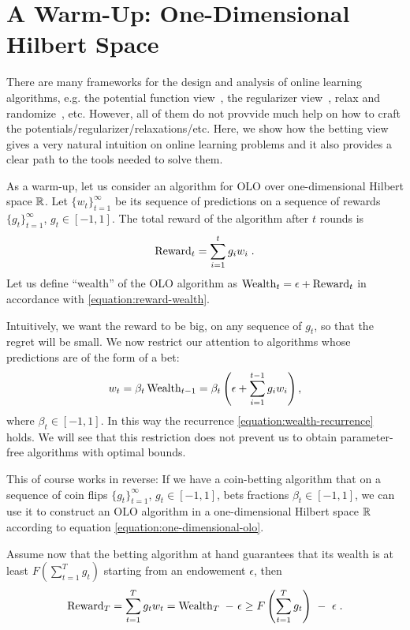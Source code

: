 \section{A Warm-Up: One-Dimensional Hilbert Space}
\label{section:one-dimensional-hilbert-space-olo}

There are many frameworks for the design and analysis of online learning
algorithms, e.g. the potential function view~\cite{Cesa-Bianchi-Lugosi-2006},
the regularizer view~\cite{Shalev-Shwartz-2011}, relax and
randomize~\cite{Rakhlin-Shamir-Sridharan-2012}, etc. However, all of them do
not provvide much help on how to craft the
potentials/regularizer/relaxations/etc.  Here, we show how the betting view
gives a very natural intuition on online learning problems and it also provides
a clear path to the tools needed to solve them.

As a warm-up, let us consider an algorithm for OLO over one-dimensional Hilbert space $\mathbb{R}$.
Let $\{w_t\}_{t=1}^\infty$ be its sequence of predictions on a sequence of
rewards $\{g_t\}_{t=1}^\infty$, $g_t \in [-1,1]$. The total reward of the
algorithm after $t$ rounds is
\[
\operatorname{Reward}_t = \sum_{i=1}^t g_i w_i \; .
\]
Let us define ``wealth'' of the OLO algorithm as $\operatorname{Wealth}_t = \epsilon +
\operatorname{Reward}_t$ in accordance with \eqref{equation:reward-wealth}.

Intuitively, we want the reward to be big, on any sequence of $g_t$, so that
the regret will be small. We now restrict our attention to algorithms whose
predictions are of the form of a bet:
\begin{equation}
\label{equation:one-dimensional-olo}
w_t = \beta_t \operatorname{Wealth}_{t-1}
= \beta_t \left(\epsilon+ \sum_{i=1}^{t-1} g_i w_i \right),
\end{equation}
where $\beta_t \in [-1,1]$. In this way the recurrence
\eqref{equation:wealth-recurrence} holds. We will see that this restriction
does not prevent us to obtain parameter-free algorithms with optimal bounds.

This of course works in reverse: If we have a coin-betting algorithm that on a
sequence of coin flips $\{g_t\}_{t=1}^\infty$, $g_t \in [-1,1]$, bets fractions
$\beta_t \in [-1,1]$, we can use it to construct an OLO algorithm in a
one-dimensional Hilbert space $\mathbb{R}$ according to equation
\eqref{equation:one-dimensional-olo}.

Assume now that the betting algorithm at hand guarantees that its wealth is at least $F(\sum_{t=1}^T g_t)$ starting from an endowement $\epsilon$, then 
\begin{equation}
\label{equation:one-dimensional-olo-reward-lower-bound}
\Reward_T
= \sum_{t=1}^T g_t w_t
= \Wealth_T \ - \ \epsilon \ge F\left(\sum_{t=1}^T g_t \right) \ - \ \epsilon \; .
\end{equation}

